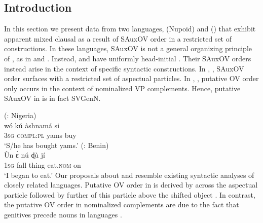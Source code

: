 \documentclass[output=paper,newtxmath,modfonts,nonflat,draftmode]{langsci/langscibook}
\begin{document}
\subsection{Introduction}

In this section we present data from two languages,  (Nupoid) and  () that exhibit apparent mixed clausal  as a result of SAuxOV order in a restricted set of constructions. In these languages, SAuxOV is not a general organizing principle of , as in  and . Instead,  and  have uniformly head-initial . Their SAuxOV orders instead arise in the context of specific syntactic constructions. In , , SAuxOV order surfaces with a restricted set of aspectual particles. In , , putative OV order only occurs in the context of nominalized VP complements. Hence, putative SAuxOV in  is in fact SVGenN. 

\ea  \label{ex:9a:gwari}  (: Nigeria)	\\
\gll wó kú \`{a}shnamá si \\
3\textsc{sg} \textsc{compl:pl} yams buy \\
\glt `S/he has bought yams.' \hfill \citep[][56]{hyman1970}
\ex \label{ex:9b:fongbe}
 (: Benin)	\\
\gll Ùn {\`ɛ} {nú} {ɖù} jí  \\
1\textsc{sg} fall thing eat.\textsc{nom} on  \\
\glt `I began to eat.' \hfill \citep[][215]{lefebvre2002}
\z
\z 
Our proposals about  and  resemble existing syntactic analyses of closely related languages. Putative OV order in  is derived by  across the aspectual particle followed by further  of this particle above the shifted object \citep{manfredi97,kandy03,aboh09}. In contrast, the putative OV order in  nominalized complements are due to the fact that genitives precede nouns in  languages \citep{aboh05}.

%
%
\end{document}
